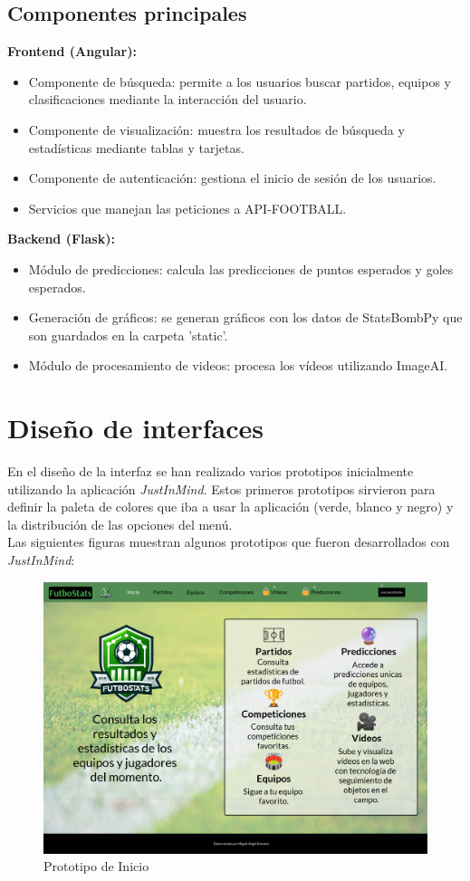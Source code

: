 \subsection{Componentes principales}
\textbf{Frontend (Angular):}
\begin{itemize}
    \item Componente de búsqueda: permite a los usuarios buscar partidos, equipos y clasificaciones mediante la interacción del usuario.
    \item Componente de visualización: muestra los resultados de búsqueda y estadísticas mediante tablas y tarjetas.
    \item Componente de autenticación: gestiona el inicio de sesión de los usuarios.
    \item Servicios que manejan las peticiones a API-FOOTBALL.
\end{itemize}
\textbf{Backend (Flask):}
\begin{itemize}
    \item Módulo de predicciones: calcula las predicciones de puntos esperados y goles esperados.
    \item Generación de gráficos: se generan gráficos con los datos de StatsBombPy que son guardados en la carpeta 'static'.
    \item Módulo de procesamiento de videos: procesa los vídeos utilizando ImageAI.
\end{itemize}

\section{Diseño de interfaces}
En el diseño de la interfaz se han realizado varios prototipos inicialmente utilizando la aplicación \textit{JustInMind}. Estos primeros prototipos sirvieron para definir la paleta de colores que iba a usar la aplicación (verde, blanco y negro) y la distribución de las opciones del menú. \\
Las siguientes figuras muestran algunos prototipos que fueron desarrollados con \textit{JustInMind}:

\begin{figure}[H]
    \centering
    \includegraphics[width=0.7\linewidth]{img/prototipo.png}
    \caption{Prototipo de Inicio}
    \label{fig:enter-label}
\end{figure}

